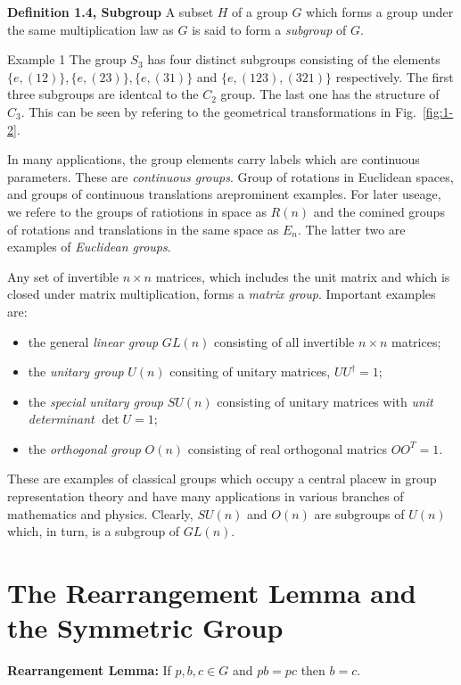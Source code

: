 \textbf{Definition 1.4, Subgroup} A subset $H$ of a group $G$ which forms a group under the same multiplication law as $G$ is said to form a \textit{subgroup} of $G$.

\textrm{Example 1} The group $S_{3}$ has four distinct subgroups consisting of the elements $\{e, \left(12\right)\}, \{e, \left(23\right)\}, \{e, \left(31\right)\}$ and $\{e, \left(123\right), \left(321\right)\}$ respectively.
The first three subgroups are identcal to the $C_{2}$ group.
The last one has the structure of $C_{3}$.
This can be seen by refering to the geometrical transformations in Fig.~\ref{fig:1-2}.

In many applications, the group elements carry labels which are continuous parameters.
These are \textit{continuous groups}.
Group of rotations in Euclidean spaces, and groups of continuous translations areprominent examples.
For later useage, we refere to the groups of ratiotions in space as $R\left(n\right)$ and the comined groups of rotations and translations in the same space as $E_{n}$.
The latter two are examples of \textit{Euclidean groups}.

Any set of invertible $n\times n$ matrices, which includes the unit matrix and which is closed under matrix multiplication, forms a \textit{matrix group}.
Important examples are:
\begin{itemize}
  \item the general \textit{linear group} $GL \left(n\right)$ consisting of all invertible $n\times n$ matrices;
  \item the \textit{unitary group} $U \left(n\right)$ consiting of unitary matrices, $U U^{\dagger} =1$;
  \item the \textit{special unitary group} $SU\left(n\right)$ consisting of unitary matrices with \textit{unit determinant} $\det{U}=1$;
  \item the \textit{orthogonal group} $O \left(n\right)$ consisting of real orthogonal matrics $OO^{T} = 1$.
\end{itemize}

These are examples of classical groups which occupy a central placew in group representation theory and have many applications in various branches of mathematics and physics.
Clearly, $SU\left(n\right)$ and $O\left(n\right)$ are subgroups of $U\left(n\right)$ which, in turn, is a subgroup of $GL\left(n\right)$.

\section{The Rearrangement Lemma and the Symmetric Group}
\textbf{Rearrangement Lemma:} If $p, b, c \in G$ and $pb = pc$ then $b=c$.

